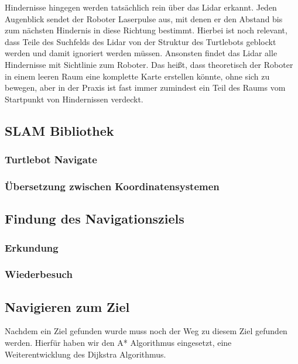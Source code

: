 Hindernisse hingegen werden tatsächlich rein über das Lidar erkannt.
Jeden Augenblick sendet der Roboter Laserpulse aus, mit denen er den Abstand bis zum nächsten Hindernis in diese Richtung
bestimmt.
Hierbei ist noch relevant, dass Teile des Suchfelds des Lidar von der Struktur des Turtlebots geblockt werden und damit
ignoriert werden müssen.
Ansonsten findet das Lidar alle Hindernisse mit Sichtlinie zum Roboter.
Das heißt, dass theoretisch der Roboter in einem leeren Raum eine komplette Karte erstellen könnte, ohne sich zu bewegen,
aber in der Praxis ist fast immer zumindest ein Teil des Raums vom Startpunkt von Hindernissen verdeckt.
\subsection{SLAM Bibliothek}\label{subsec:slam-bibliothek}

\subsubsection{Turtlebot Navigate} %
\subsubsection{Übersetzung zwischen Koordinatensystemen}
\subsection{Findung des Navigationsziels}\label{subsec:findung-des-navigationsziels}

\subsubsection{Erkundung}
\subsubsection{Wiederbesuch}
\subsection{Navigieren zum Ziel}\label{subsec:navigierung-zum-ziel}
Nachdem ein Ziel gefunden wurde muss noch der Weg zu diesem Ziel gefunden werden.
Hierfür haben wir den A* Algorithmus eingesetzt, eine Weiterentwicklung des Dijkstra Algorithmus.
